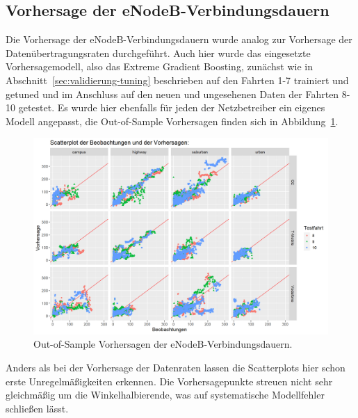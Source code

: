 \subsection{Vorhersage der eNodeB-Verbindungsdauern}

Die Vorhersage der eNodeB-Verbindungsdauern wurde analog zur Vorhersage der Daten\"ubertragungsraten durchgef\"uhrt.
Auch hier wurde das eingesetzte Vorhersagemodell, also das Extreme Gradient Boosting, zun\"achst wie in
Abschnitt~\ref{sec:validierung-tuning} beschrieben auf den Fahrten \mbox{1-7} trainiert und getuned und im Anschluss
auf den neuen und ungesehenen Daten der Fahrten \mbox{8-10} getestet.
Es wurde hier ebenfalls f\"ur jeden der Netzbetreiber ein eigenes Modell angepasst, 
die Out-of-Sample Vorhersagen finden sich in Abbildung~\ref{fig:link-lifetime-predictions}.
\begin{figure}
    \centering
    \includegraphics[width=\textwidth]{abbildungen/predictions_linklifetime}
    \caption{Out-of-Sample Vorhersagen der eNodeB-Verbindungsdauern.}
    \label{fig:link-lifetime-predictions}
\end{figure}

Anders als bei der Vorhersage der Datenraten lassen die Scatterplots hier schon erste Unregelm\"a{\ss}igkeiten erkennen.
Die Vorhersagepunkte streuen nicht sehr gleichm\"a{\ss}ig um die Winkelhalbierende, was auf systematische Modellfehler schlie{\ss}en
l\"asst.

